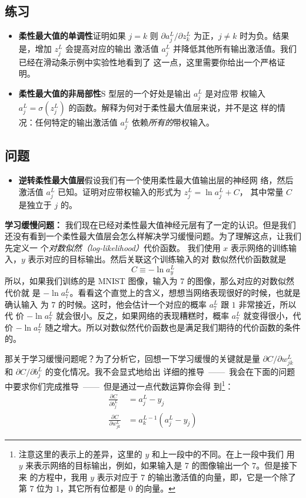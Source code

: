 \subsection*{练习}

\begin{itemize}
\item \textbf{柔性最大值的单调性}\quad 证明如果 $j=k$ 则 $\partial a^L_j /
  \partial z^L_k$ 为正，$j \neq k$ 时为负。结果是，增加 $z^L_j$ 会提高对应的输出
  激活值 $a^L_j$ 并降低其他所有输出激活值。我们已经在滑动条示例中实验性地看到了
  这一点，这里需要你给出一个严格证明。
\item \textbf{柔性最大值的非局部性}\quad S 型层的一个好处是输出 $a^L_j$ 是对应带
  权输入 $a^L_j = \sigma(z^L_j)$ 的函数。解释为何对于柔性最大值层来说，并不是这
  样的情况：任何特定的输出激活值 $a^L_j$ 依赖\emph{所有的}带权输入。
\end{itemize}

\subsection*{问题}

\begin{itemize}
\item \textbf{逆转柔性最大值层}\quad 假设我们有一个使用柔性最大值输出层的神经网
  络，然后激活值 $a^L_j$ 已知。证明对应带权输入的形式为 $z^L_j = \ln a^L_j + C$，
  其中常量 $C$ 是独立于 $j$ 的。
\end{itemize}

\textbf{学习缓慢问题：} 我们现在已经对柔性最大值神经元层有了一定的认识。但是我们
还没有看到一个柔性最大值层会怎么样解决学习缓慢问题。为了理解这点，让我们先定义一
个\emph{对数似然（log-likelihood）}代价函数。
我们使用 $x$ 表示网络的训练输入，$y$ 表示对应的目标输出。然后关联这个训练输入的对
数似然代价函数就是
\begin{equation}
  C \equiv -\ln a^L_y
  \label{eq:80}\tag{80}
\end{equation}
所以，如果我们训练的是 MNIST 图像，输入为 $7$ 的图像，那么对应的对数似然代价就
是 $-\ln a_7^L$。看看这个直觉上的含义，想想当网络表现很好的时候，也就是确认输入
为 $7$ 的时候。这时，他会估计一个对应的概率 $a_7^L$ 跟 $1$ 非常接近，所以代
价 $-\ln a_7^L$ 就会很小。反之，如果网络的表现糟糕时，概率 $a_7^L$ 就变得很小，代
价 $-\ln a_7^L$ 随之增大。所以对数似然代价函数也是满足我们期待的代价函数的条件
的。

那关于学习缓慢问题呢？为了分析它，回想一下学习缓慢的关键就是量 $\partial C /
\partial w^L_{jk}$ 和 $\partial C / \partial b^L_j$ 的变化情况。我不会显式地给出
详细的推导~——~我会在下面的问题中要求你们完成推导~——~但是通过一点代数运算你会得
到\footnote{注意这里的表示上的差异，这里的 $y$ 和上一段中的不同。在上一段中我们
  用 $y$ 来表示网络的目标输出，例如，如果输入是 7 的图像输出一个 $7$。但是接下来
  的方程中，我用 $y$ 表示对应于 $7$ 的输出激活值的向量，即，它是一个除了
  第 7 位为 $1$，其它所有位都是 $0$ 的向量。}：
\begin{align}
  \frac{\partial C}{\partial b^L_j} &= a^L_j-y_j \label{eq:81}\tag{81}\\
  \frac{\partial C}{\partial w^L_{jk}} &= a^{L-1}_k (a^L_j-y_j) \label{eq:82}\tag{82}
\end{align}

